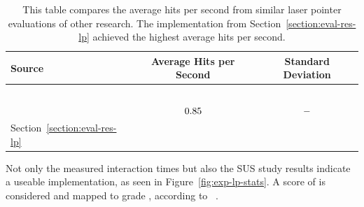 \begin{table}[H]
	\centering
	\begin{tabular}{l c c}
		\toprule
		Source                                            & Average Hits per Second                                                            & Standard Deviation                                                                \\
		\midrule
		\citeauthor{Kamm.2018}~\cite{Kamm.2018}           & \pgfmathparse{\kammAvgHits}\pgfmathprintnumber[fixed, precision=2]{\pgfmathresult} & \pgfmathparse{\kammAvgStd}\pgfmathprintnumber[fixed, precision=2]{\pgfmathresult} \\%
		\citeauthor{JiYoungOh.2002}~\cite{JiYoungOh.2002} & \(0.85{}\)                                                                  & \(-{}\)                                                                  \\%
		Section~\ref{section:eval-res-lp}                 & \pgfmathparse{\oursAvgHits}\pgfmathprintnumber[fixed, precision=2]{\pgfmathresult} & \pgfmathparse{\oursAvgStd}\pgfmathprintnumber[fixed, precision=2]{\pgfmathresult} \\
		\bottomrule
	\end{tabular}
	\caption[Comparison of laser pointer task results]{This table compares the average hits per second from similar laser pointer evaluations of other research. The implementation from Section~\ref{section:eval-res-lp} achieved the highest average hits per second.}\label{tab:lp-comp}
\end{table}

Not only the measured interaction times but also the \gls{SUS} study results indicate a useable implementation, as seen in Figure~\ref{fig:exp-lp-stats}. A score of \evalExpLpSusScore{} is considered \evalExpLpSusAdj{} and mapped to grade \evalExpLpSusGrade{}, according to \citeauthor{Bangor.2009}~\cite[120\psq]{Bangor.2009}.

